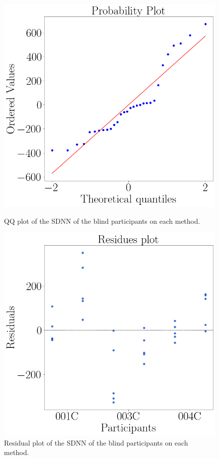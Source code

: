 \begin{figure}[!htb]
    \centering
    \begin{minipage}{0.45\textwidth}
        \centering
        \includegraphics[width = 0.8\linewidth]{Resultados/GSR/Figuras/png/qqplot_gsr_two_way_blind.png}
        \caption{QQ plot of the SDNN of the blind participants on each method.}
        \label{fig:qqplot_gsr_two_way_blind}
    \end{minipage}
    \begin{minipage}{0.45\textwidth}
        \centering
        \includegraphics[width = 0.8\linewidth]{Resultados/GSR/Figuras/png/residplot_gsr_two_way_blind.png}
        \caption{Residual plot of the SDNN of the blind participants on each method.}
        \label{fig:residplot_gsr_two_way_blind}
    \end{minipage}
\end{figure}

